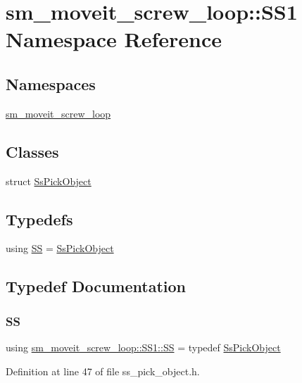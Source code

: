 \hypertarget{namespacesm__moveit__screw__loop_1_1SS1}{}\section{sm\+\_\+moveit\+\_\+screw\+\_\+loop\+:\+:S\+S1 Namespace Reference}
\label{namespacesm__moveit__screw__loop_1_1SS1}
\subsection*{Namespaces}
\begin{DoxyCompactItemize}
\item 
 \hyperlink{namespacesm__moveit__screw__loop_1_1SS1_1_1sm__moveit__screw__loop}{sm\+\_\+moveit\+\_\+screw\+\_\+loop}
\end{DoxyCompactItemize}
\subsection*{Classes}
\begin{DoxyCompactItemize}
\item 
struct \hyperlink{structsm__moveit__screw__loop_1_1SS1_1_1SsPickObject}{Ss\+Pick\+Object}
\end{DoxyCompactItemize}
\subsection*{Typedefs}
\begin{DoxyCompactItemize}
\item 
using \hyperlink{namespacesm__moveit__screw__loop_1_1SS1_a15d093831c02def6ec099bfb65348dad}{SS} = \hyperlink{structsm__moveit__screw__loop_1_1SS1_1_1SsPickObject}{Ss\+Pick\+Object}
\end{DoxyCompactItemize}


\subsection{Typedef Documentation}
\mbox{\label{namespacesm__moveit__screw__loop_1_1SS1_a15d093831c02def6ec099bfb65348dad}} 
\subsubsection{\texorpdfstring{SS}{SS}}
{\footnotesize\ttfamily using \hyperlink{namespacesm__moveit__screw__loop_1_1SS1_a15d093831c02def6ec099bfb65348dad}{sm\+\_\+moveit\+\_\+screw\+\_\+loop\+::\+S\+S1\+::\+SS} = typedef \hyperlink{structsm__moveit__screw__loop_1_1SS1_1_1SsPickObject}{Ss\+Pick\+Object}}



Definition at line 47 of file ss\+\_\+pick\+\_\+object.\+h.

